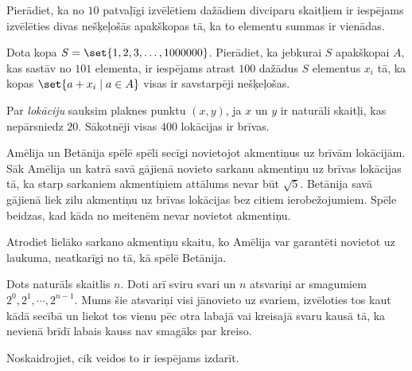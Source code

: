 



\renewcommand{\theenumi}{\alph{enumi}}



 


\begin{problem}

Pierādiet, ka no $10$ patvaļīgi izvēlētiem dažādiem divciparu skaitļiem ir iespējams izvēlēties divas nešķeļošās apakškopas tā, ka to elementu summas ir vienādas.

\end{problem}

\begin{problem}

Dota kopa $S = \set{1, 2, 3, \dots ,1000000}$. Pierādiet, ka jebkurai $S$ apakškopai $A$, kas sastāv no $101$ elementa, ir iespējams atrast $100$ dažādus $S$ elementus $x_i$ tā, ka kopas $\set{a + x_i \mid a \in A}$ visas ir savstarpēji nešķeļošas.


\end{problem}


\begin{problem}

Par \emph{lokāciju} sauksim plaknes punktu $(x, y)$, ja $x$ un $y$ ir naturāli skaitļi, kas nepārsniedz $20$. 
Sākotnēji visas $400$ lokācijas ir brīvas.

Amēlija un Betānija spēlē spēli secīgi novietojot akmentiņus uz brīvām lokācijām. Sāk Amēlija un katrā savā gājienā novieto sarkanu akmentiņu uz brīvas lokācijas tā, ka starp sarkaniem akmentiņiem attālums nevar būt $\sqrt{5}$.
Betānija savā gājienā liek zilu akmentiņu uz brīvas lokācijas bez citiem ierobežojumiem.
Spēle beidzas, kad kāda no meitenēm nevar novietot akmentiņu. 

Atrodiet lielāko sarkano akmentiņu skaitu, ko Amēlija var garantēti novietot uz laukuma, neatkarīgi no tā, kā spēlē Betānija.


\end{problem}

\begin{problem}
Dots naturāls skaitlis $n$. 
Doti arī sviru svari un $n$ atsvariņi ar smagumiem $2^0,2^1, \cdots ,2^{n-1}$.
Mums šie atsvariņi visi jānovieto uz svariem, izvēloties tos kaut kādā secībā un liekot tos vienu pēc otra labajā vai kreisajā svaru kausā tā, ka nevienā brīdī labais kauss nav smagāks par kreiso.

Noskaidrojiet, cik veidos to ir iespējams izdarīt.
\end{problem}

